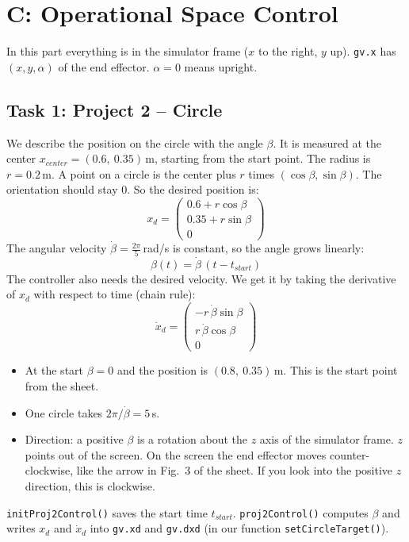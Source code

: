\documentclass[11pt, a4paper]{article}
\begin{document}
\section*{C: Operational Space Control}

In this part everything is in the simulator frame ($x$ to the right, $y$ up). \texttt{gv.x} has
$(x, y, \alpha)$ of the end effector. $\alpha = 0$ means upright.

\subsection*{Task 1: Project 2 -- Circle}

We describe the position on the circle with the angle $\beta$. It is measured at the center
$x_{center} = (0.6,\ 0.35)$\,m, starting from the start point. The radius is $r = 0.2$\,m. A point on a
circle is the center plus $r$ times $(\cos\beta, \sin\beta)$. The orientation should stay 0. So the
desired position is:
\[
  x_d = \begin{pmatrix} 0.6 + r \cos\beta \\ 0.35 + r \sin\beta \\ 0 \end{pmatrix}
\]
The angular velocity $\dot\beta = \frac{2\pi}{5}$\,rad/s is constant, so the angle grows linearly:
\[
  \beta(t) = \dot\beta\,(t - t_{start})
\]
The controller also needs the desired velocity. We get it by taking the derivative of $x_d$ with
respect to time (chain rule):
\[
  \dot x_d = \begin{pmatrix} -r\,\dot\beta \sin\beta \\ r\,\dot\beta \cos\beta \\ 0 \end{pmatrix}
\]
\begin{itemize}
  \item At the start $\beta = 0$ and the position is $(0.8,\ 0.35)$\,m. This is the start point from
        the sheet.
  \item One circle takes $2\pi / \dot\beta = 5$\,s.
  \item Direction: a positive $\beta$ is a rotation about the $z$ axis of the simulator frame. $z$
        points out of the screen. On the screen the end effector moves counter-clockwise, like the
        arrow in Fig.~3 of the sheet. If you look into the positive $z$ direction, this is clockwise.
\end{itemize}
\texttt{initProj2Control()} saves the start time $t_{start}$. \texttt{proj2Control()} computes $\beta$
and writes $x_d$ and $\dot x_d$ into \texttt{gv.xd} and \texttt{gv.dxd} (in our function
\texttt{setCircleTarget()}).
\end{document}
